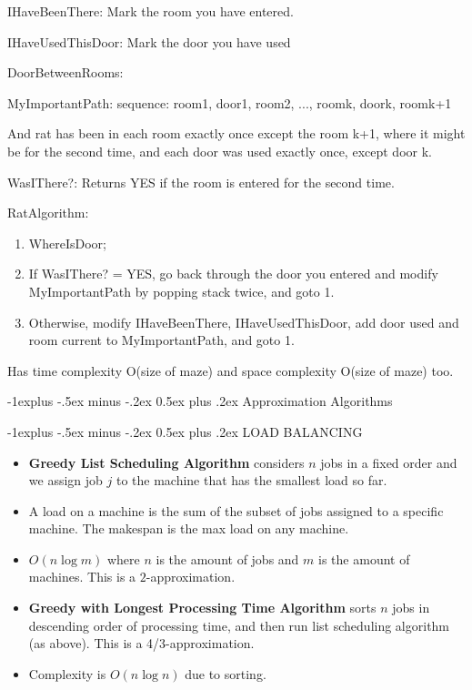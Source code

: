 \documentclass[letterpaper, 8pt]{extarticle}
\makeatletter
\renewcommand{\section}{\@startsection{section}{1}{0mm}%
                                {-1explus -.5ex minus -.2ex}%
                                {0.5ex plus .2ex}%
                                {\normalfont\normalsize\bfseries}}
\renewcommand{\subsection}{\@startsection{subsection}{2}{0mm}%
                                {-1explus -.5ex minus -.2ex}%
                                {0.5ex plus .2ex}%
                                {\normalfont\small\bfseries}}
\makeatother
\begin{document}
\begin{multicols*}{5}
IHaveBeenThere: Mark the room you have entered.

IHaveUsedThisDoor: Mark the door you have used

DoorBetweenRooms:

MyImportantPath:
sequence: room1, door1, room2, ..., roomk, doork, roomk+1

And rat has been in each room exactly once except the room k+1, where it might be for the second time, and each door was used exactly once, except door k.

WasIThere?: Returns YES if the room is entered for the second time.

RatAlgorithm:
\begin{enumerate}
    \item WhereIsDoor;
    \item If WasIThere? = YES, go back through the door you entered and modify MyImportantPath by popping stack twice, and goto 1.
    \item Otherwise, modify IHaveBeenThere, IHaveUsedThisDoor, add door used and room current to MyImportantPath, and goto 1.
\end{enumerate}

Has time complexity O(size of maze) and space complexity O(size of maze) too.

\section{Approximation Algorithms}

\subsection{LOAD BALANCING}
\begin{itemize}
    \item \textbf{Greedy List Scheduling Algorithm} considers $n$ jobs in a fixed order and we assign job $j$ to the machine that has the smallest load so far.
    \item A load on a machine is the sum of the subset of jobs assigned to a specific machine. The makespan is the max load on any machine.
    \item $O(n \log m)$ where $n$ is the amount of jobs and $m$ is the amount of machines. This is a $2$-approximation.
    \item \textbf{Greedy with Longest Processing Time Algorithm} sorts $n$ jobs in descending order of processing time, and then run list scheduling algorithm (as above). This is a 4/3-approximation.
    \item Complexity is $O(n \log n)$ due to sorting.
\end{itemize}


\end{multicols*}
\end{document}
